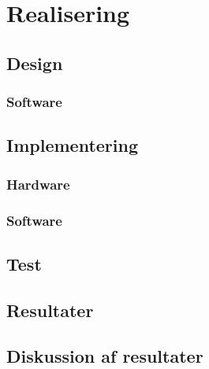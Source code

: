 \documentclass[a4paper, 11pt, oneside]{AuProjectHandin}
\begin{document}

\frontmatter
\tableofcontents
\mainmatter





\chapter{Realisering}


\section{Design}
\label{sec:Design}

\subsection{Software}



\section{Implementering}
\subsection{Hardware}
\subsection{Software}



\section{Test}



\section{Resultater}


\section{Diskussion af resultater}



\backmatter

\end{document}
